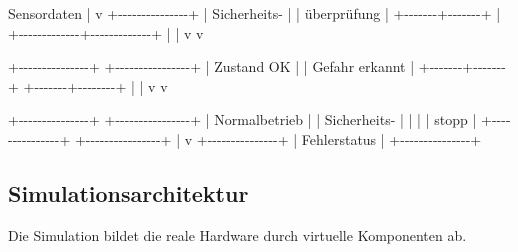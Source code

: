 \documentclass[
  a4paper,
  12pt,
  DIV=12,        %
  parskip=half,  %
  headings=small %
]{scrartcl}
\theoremstyle{definition}
\theoremstyle{definition}
\newenvironment{Shaded}{}{}
\newcommand{\NormalTok}[1]{#1}
\begin{document}
\begin{Shaded}
\begin{Highlighting}[]
\NormalTok{                 Sensordaten}
\NormalTok{                      |}
\NormalTok{                      v}
\NormalTok{              +{-}{-}{-}{-}{-}{-}{-}{-}{-}{-}{-}{-}{-}{-}{-}+}
\NormalTok{              | Sicherheits{-}  |}
\NormalTok{              | überprüfung   |}
\NormalTok{              +{-}{-}{-}{-}{-}{-}{-}+{-}{-}{-}{-}{-}{-}{-}+}
\NormalTok{                      |}
\NormalTok{        +{-}{-}{-}{-}{-}{-}{-}{-}{-}{-}{-}{-}{-}+{-}{-}{-}{-}{-}{-}{-}{-}{-}{-}{-}{-}{-}+}
\NormalTok{        |                           |}
\NormalTok{        v                           v}

\NormalTok{+{-}{-}{-}{-}{-}{-}{-}{-}{-}{-}{-}{-}{-}{-}{-}+          +{-}{-}{-}{-}{-}{-}{-}{-}{-}{-}{-}{-}{-}{-}{-}{-}+}
\NormalTok{| Zustand OK    |          | Gefahr erkannt |}
\NormalTok{+{-}{-}{-}{-}{-}{-}{-}+{-}{-}{-}{-}{-}{-}{-}+          +{-}{-}{-}{-}{-}{-}{-}+{-}{-}{-}{-}{-}{-}{-}{-}+}
\NormalTok{        |                         |}
\NormalTok{        v                         v}

\NormalTok{+{-}{-}{-}{-}{-}{-}{-}{-}{-}{-}{-}{-}{-}{-}{-}+          +{-}{-}{-}{-}{-}{-}{-}{-}{-}{-}{-}{-}{-}{-}{-}{-}+}
\NormalTok{| Normalbetrieb |          | Sicherheits{-}   |}
\NormalTok{|               |          | stopp          |}
\NormalTok{+{-}{-}{-}{-}{-}{-}{-}{-}{-}{-}{-}{-}{-}{-}{-}+          +{-}{-}{-}{-}{-}{-}{-}{-}{-}{-}{-}{-}{-}{-}{-}{-}+}
\NormalTok{                                      |}
\NormalTok{                                      v}
\NormalTok{                              +{-}{-}{-}{-}{-}{-}{-}{-}{-}{-}{-}{-}{-}{-}{-}+}
\NormalTok{                              | Fehlerstatus  |}
\NormalTok{                              +{-}{-}{-}{-}{-}{-}{-}{-}{-}{-}{-}{-}{-}{-}{-}+}
\end{Highlighting}
\end{Shaded}

\subsection{Simulationsarchitektur}\label{simulationsarchitektur-2}

Die Simulation bildet die reale Hardware durch virtuelle Komponenten ab.
\end{document}
